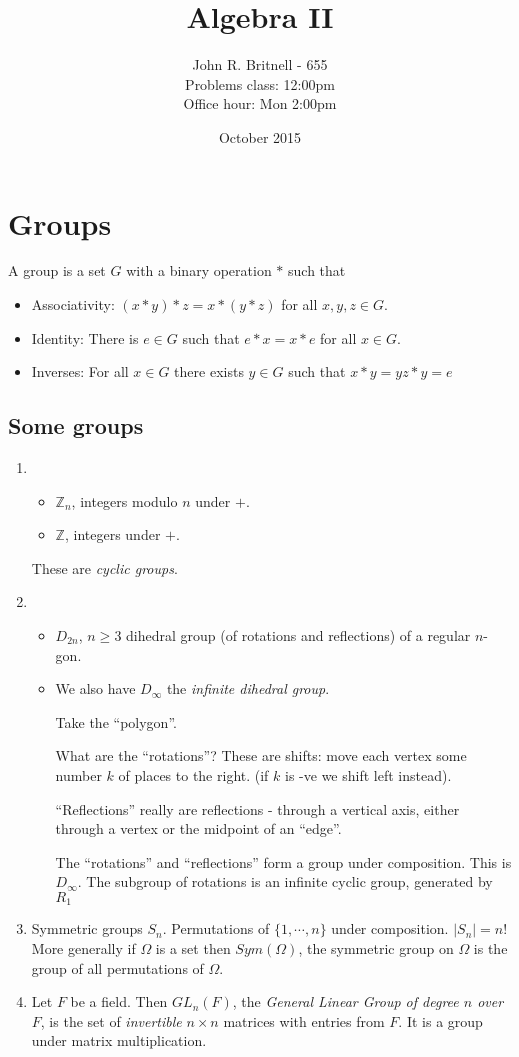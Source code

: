 \documentclass{article}
\title{Algebra II}
\author{John R. Britnell - 655\\
        Problems class: 12:00pm\\
        Office hour: Mon 2:00pm}
\date{October 2015}
\theoremstyle{definition}
\begin{document}
\maketitle

\section{Groups}
A group is a set $G$ with a binary operation $*$ such that 
\begin{itemize}
\item Associativity: $(x * y)*z = x * (y * z)$ for all $x,y,z \in G$.
\item Identity: There is $e \in G$ such that $e * x = x * e$ for all $x \in G$.
\item Inverses: For all $x \in G$ there exists $y \in G$ such that $x * y = yz * y = e$
\end{itemize}

\subsection{Some groups}
\begin{enumerate}
\item
\begin{itemize}
\item $\mathbb{Z}_n$, integers modulo $n$ under $+$.
\item $\mathbb{Z}$, integers under $+$.
\end{itemize}
These are \emph{cyclic groups}.
\item
\begin{itemize}
\item $D_{2n}$, $n \geq 3$ dihedral group (of rotations and reflections) of a regular $n$-gon.
\item We also have $D_\infty$ the \emph{infinite dihedral group}.

Take the ``polygon''.

What are the ``rotations''? These are shifts: move each vertex some number $k$ of places to the right. (if $k$ is -ve we shift left instead). 

``Reflections'' really are reflections - through a vertical axis, either through a vertex or the midpoint of an ``edge''.

The ``rotations'' and ``reflections'' form a group under composition. This is $D_\infty$. The subgroup of rotations is an infinite cyclic group, generated by $R_1$

\end{itemize}
\item Symmetric groups $S_n$. Permutations of $\{1, \cdots, n\}$ under composition. $|S_n| = n!$
More generally if $\Omega$ is a set then $Sym(\Omega)$, the symmetric group on $\Omega$ is the group of all permutations of $\Omega$.

\item Let $F$ be a field. Then $GL_n(F)$, the \emph{General Linear Group of degree $n$ over $F$}, is the set of \emph{invertible} $n \times n$ matrices with entries from $F$. It is a group under matrix multiplication. 
\end{enumerate}
\end{document}
